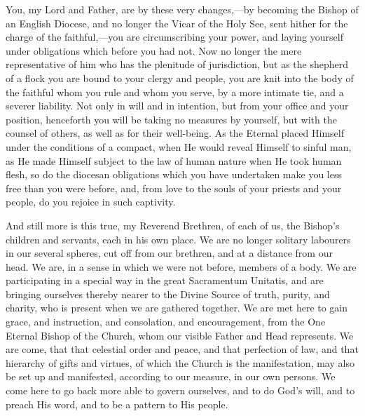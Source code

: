 You, my Lord and Father, are by these very
changes,—by becoming the Bishop of an English
Diocese, and no longer the Vicar of the Holy See, sent
hither for the charge of the faithful,—you are
circumscribing your power, and laying yourself under
obligations which before you had not. Now no longer the
mere representative of him who has the plenitude of
jurisdiction, but as the shepherd of a flock you are
bound to your clergy and people, you are knit into the
body of the faithful whom you rule and whom you serve, by
a more intimate tie, and a severer liability. Not only in
will and in intention, but from your office and your
position, henceforth you will be taking no measures by
yourself, but with the counsel of others, as well as for
their well-being. As the Eternal placed Himself under the
conditions of a compact, when He would reveal Himself to
sinful man, as He made Himself subject to the law of
human nature when He took human flesh, so do the diocesan
obligations which you have undertaken make you less free
than you were before, and, from love to the souls of your
priests and your people, do you rejoice in such
captivity.

And still more is this true, my Reverend Brethren, of
each of us, the Bishop's children and servants, each in
his own place. We are no longer solitary labourers in our
several spheres, cut off from our brethren, and at a
distance from our head. We are, in a sense in which we
were not before, members of a body. We are participating
in a special way in the great Sacramentum Unitatis, and
are bringing ourselves thereby nearer to the Divine
Source of truth, purity, and charity, who is present when
we are gathered together. We are met here to gain grace,
and instruction, and consolation, and encouragement, from
the One Eternal Bishop of the Church, whom our visible
Father and Head represents. We are come, that that
celestial order and peace, and that perfection of law,
and that hierarchy of gifts and virtues, of which the
Church is the manifestation, may also be set up and
manifested, according to our measure, in our own persons.
We come here to go back more able to govern ourselves,
and to do God's will, and to preach His word, and to be a
pattern to His people.


